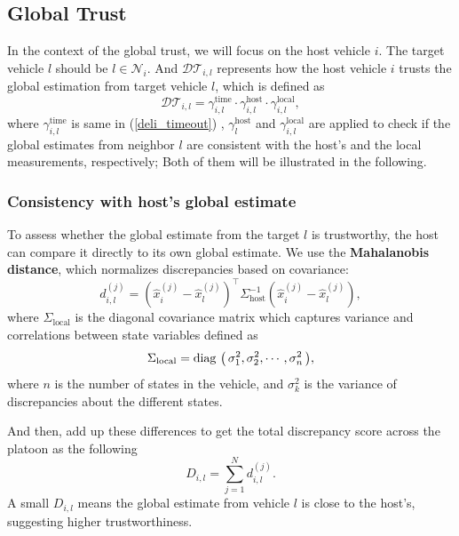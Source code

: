 \documentclass[letterpaper, 10pt, conference]{ieeeconf}  %
\def\eqref#1{(\ref{#1})}
\def\N{\mathcal{N}} %
\def\diag#1{\mathop{{\rm diag}\,\left(\,#1\,\right)}}
\def\DT{\mathcal{DT}} %
\begin{document}


\subsection{Global Trust}
In the context of the global trust, we will focus on the host vehicle $i$. The target vehicle $l$ should be $l \in \N_{i}$. And $\DT_{i,l}$ represents how the host vehicle $i$ trusts the global estimation from target vehicle $l$, which is defined as
\begin{equation}
\DT_{i,l} =  \gamma_{i,l}^{\text{time}} \cdot  \gamma_{i,l}^{\text{host}} \cdot \gamma_{i,l}^{\text{local}}, 
\end{equation}
where $\gamma_{i,l}^{\text{time}}$ is same in \eqref{deli_timeout} , $\gamma_{l}^{\text{host}}$ and $\gamma_{i,l}^{\text{local}}$ are applied to check if the global estimates from neighbor $l$ are consistent with the host's and the local measurements, respectively; 
Both of them will be illustrated in the following. 

\subsubsection{Consistency with host's global estimate}
To assess whether the global estimate from the target $l$ is trustworthy, the host can compare it directly to its own global estimate. We use the \textbf{Mahalanobis distance}, which normalizes discrepancies based on covariance:
\begin{equation}
    d_{i,l}^{(j)} = \left( \hat{x}_i^{(j)} - \hat{x}_l^{(j)} \right)^{\top} \Sigma_{\text{host}}^{-1} \left( \hat{x}_i^{(j)} - \hat{x}_l^{(j)} \right), 
    \label{eq_dis_glo}
\end{equation}
where $\Sigma_{\text{local}}$ is the diagonal covariance matrix  which captures variance and correlations between state variables defined as 
\begin{equation}
\Sigma_{\text{local}} = \diag{\sigma^2_1, \sigma^2_2, \cdots , \sigma^2_n},
\end{equation}
where $n$ is the number of states in the vehicle, and $\sigma^2_k$ is  the variance of discrepancies about the different states. 

And then, add up these differences to get the total discrepancy score across the platoon as the following
\begin{equation}
    D_{i,l} = \sum_{j=1}^N d_{i,l}^{(j)}.
\end{equation}
A small  $D_{i,l}$ means the global estimate from vehicle $l$ is close to the host's, suggesting higher trustworthiness.
\end{document}
